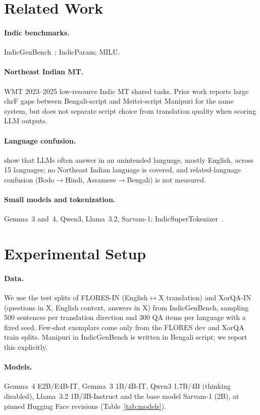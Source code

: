 \documentclass[11pt]{article}
\begin{document}
\section{Related Work}
\paragraph{Indic benchmarks.} IndicGenBench~\citep{singh2024indicgenbench}; IndicParam; MILU.
\paragraph{Northeast Indian MT.} WMT 2023--2025 low-resource Indic MT shared tasks. Prior work reports
large chrF gaps between Bengali-script and Meitei-script Manipuri for the same system, but does not
separate script choice from translation quality when scoring LLM outputs.
\paragraph{Language confusion.} \citet{marchisio2024confusion} show that LLMs often answer in an
unintended language, mostly English, across 15 languages; no Northeast Indian language is covered,
and related-language confusion (Bodo$\rightarrow$Hindi, Assamese$\rightarrow$Bengali) is not measured.
\paragraph{Small models and tokenization.} Gemma~3 and~4, Qwen3, Llama~3.2, Sarvam-1; IndicSuperTokenizer~\citep{indicsupertokenizer}.

\section{Experimental Setup}
\paragraph{Data.} We use the test splits of FLORES-IN (English$\leftrightarrow$X translation) and
XorQA-IN (questions in X, English context, answers in X) from IndicGenBench, sampling
500 sentences per translation direction and 300 QA items per language with a fixed seed.
Few-shot exemplars come only from the FLORES dev and XorQA train splits.
Manipuri in IndicGenBench is written in Bengali script; we report this explicitly.
\paragraph{Models.} Gemma~4 E2B/E4B-IT, Gemma~3 1B/4B-IT, Qwen3 1.7B/4B (thinking disabled), Llama~3.2 1B/3B-Instruct
and the base model Sarvam-1 (2B), at pinned Hugging Face revisions (Table~\ref{tab:models}).
\end{document}
